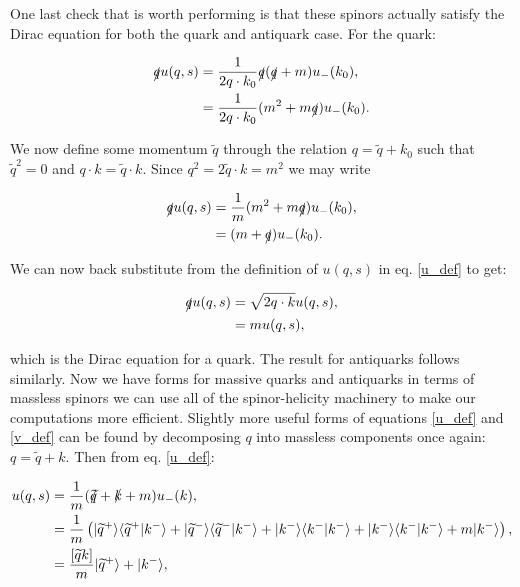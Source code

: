 		One last check that is worth performing is that these spinors actually satisfy the Dirac equation for both the quark and antiquark case.  For the quark:

		\begin{subequations}
		\begin{align*}
			\slashed q u(q, s) &= \frac{1}{2q\cdot k_0}\slashed q(\slashed q + m)u_-(k_0), \\
			                   &= \frac{1}{2q\cdot k_0}(m^2 + m\slashed q)u_-(k_0). \\
		\end{align*}
		\end{subequations}

		We now define some momentum $\widetilde{q}$ through the relation $q = \widetilde{q} + k_0$ such that $\widetilde{q}^2=0$ and
		$q\cdot k = \widetilde{q}\cdot k$.  Since $q^2=2\widetilde{q}\cdot k=m^2$ we may write

		\begin{subequations}
		\begin{align*}
			\slashed q u(q, s) &= \frac{1}{m}(m^2 + m\slashed q)u_-(k_0), \\
			                   &= (m + \slashed q)u_-(k_0). \\
		\end{align*}
		\end{subequations}

		We can now back substitute from the definition of $u(q, s)$ in eq. \eqref{u_def} to get:

		\begin{subequations}
		\begin{align*}
			\slashed q u(q, s) &= \sqrt{2q\cdot k}u(q, s), \\
			                   &= mu(q,s), \\
		\end{align*}
		\end{subequations}

		which is the Dirac equation for a quark.  The result for antiquarks follows similarly.
		Now we have forms for massive quarks and antiquarks in terms of massless spinors we can
		use all of the spinor-helicity machinery to make our computations more efficient.  Slightly
		more useful forms of equations \eqref{u_def} and \eqref{v_def} can be found by decomposing $q$
		into massless components once again: $q=\widetilde{q}+k$.  Then from eq. \eqref{u_def}:

		\begin{subequations}
		\begin{align*}
			u(q, s) &= \frac{1}{m}(\slashed{\widetilde{q}} + \slashed{k} + m)u_-(k), \\
			        &= \frac{1}{m}\left(|\widetilde{q}^+ \rangle\langle \widetilde{q}^+|k^-\rangle +
			        |\widetilde{q}^- \rangle\langle \widetilde{q}^-|k^-\rangle + |k^- \rangle\langle k^-|k^-\rangle +
			        |k^- \rangle\langle k^-|k^-\rangle + m|k^-\rangle\right), \\
			        &= \frac{[\widetilde{q}k]}{m}|\widetilde{q}^+\rangle + |k^-\rangle,
		\end{align*}
		\end{subequations}

